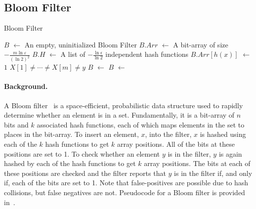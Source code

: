 \documentclass[acmsmall,review,anonymous]{acmart}\settopmatter{printfolios=true,printccs=false,printacmref=false}
\newcommand*\Let[2]{\State #1 $\gets$ #2}
\begin{document}
\subsection{Bloom Filter}
\label{sec:bloom_filter}
\begin{algorithm}
  \caption{Bloom Filter}
  \label{alg:bloom_filter}
  \begin{algorithmic}[1]
    \Let{$B$}{An empty, uninitialized Bloom Filter}
    \Let{$B.Arr$}{A bit-array of size $-\frac{m\ln \varepsilon}{(\ln 2)^2}$}
    \Let{$B.H$}{A list of $-\frac{\ln \epsilon}{\ln 2}$ independent hash functions}
    \State{}
    \EndFunction
    \Statex
    \Let{$B.Arr[h(x)]$}{$1$}
    \EndFor
    \State{}
    \EndFunction
    \Statex
    \State{}
    \EndIf
    \EndFor
    \State{}
    \EndFunction
    \Statex
    \Require $X[1] \neq \cdots \neq X[m] \neq y$
    \label{line:bloom_filter_main}
    \Let{$B$}{}
    \Let{$B$}{}
    \EndFor
    \State{}
    \EndFunction
  \end{algorithmic}
\end{algorithm}

\paragraph*{Background.}
A Bloom filter~\citep{bloom_1970} is a space-efficient, probabilistic data structure used to rapidly determine whether an element is in a set.
% 
Fundamentally, it is a bit-array of $n$ bits and $k$ associated hash functions, each of which maps elements in the set to places in the bit-array.
% 
To insert an element, $x$, into the filter, $x$ is hashed using each of the $k$ hash functions to get $k$ array positions.
% 
All of the bits at these positions are set to 1.
% 
To check whether an element $y$ is in the filter, $y$ is again hashed by each of the hash functions to get $k$ array positions.
% 
The bits at each of these positions are checked and the filter reports that $y$ is in the filter if, and only if, each of the bits are set to 1.
% 
Note that false-positives are possible due to hash collisions, but false negatives are not.
% 
Pseudocode for a Bloom filter is provided in~.
\end{document}
